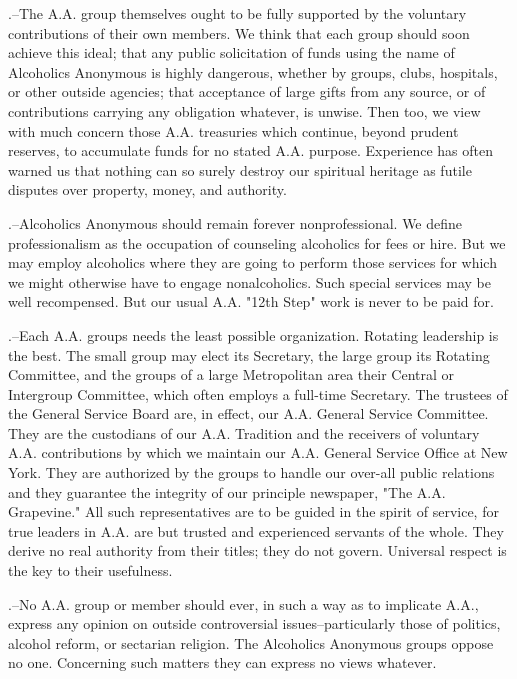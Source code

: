 \begin{biblechapter}
.--The A.A. group themselves ought to be fully supported 
    by the voluntary contributions of their own members.
    We think that each group should soon achieve this ideal; 
    that any public solicitation of funds 
    using the name of Alcoholics Anonymous is highly dangerous, 
    whether by groups, clubs, hospitals, or other outside agencies; 
    that acceptance of large gifts from any source, 
    or of contributions carrying any obligation whatever, is unwise.
    Then too, we view with much concern 
    those A.A. treasuries which continue, beyond prudent reserves, 
    to accumulate funds for no stated A.A. purpose.
    Experience has often warned us that nothing can so surely destroy our spiritual heritage as futile disputes over 
    property, money, and authority.

.--Alcoholics Anonymous should remain forever nonprofessional.
    We define professionalism as the occupation of 
    counseling alcoholics for fees or hire.
    But we may employ alcoholics 
    where they are going to perform those services for which 
    we might otherwise have to engage nonalcoholics.  
    Such special services may be well recompensed.
    But our usual A.A. "12th Step" work is never to be paid for.

.--Each A.A. groups needs the least possible organization.
    Rotating leadership is the best.
    The small group may elect its Secretary, 
    the large group its Rotating Committee, 
    and the groups of a large Metropolitan area their Central or Intergroup Committee, 
    which often employs a full-time Secretary.
    The trustees of the General Service Board are, in effect, 
    our A.A. General Service Committee.
    They are the custodians of our A.A. Tradition 
    and the receivers of voluntary A.A. contributions 
    by which we maintain our A.A. General Service Office at New York.
    They are authorized by the groups 
    to handle our over-all public relations 
    and they guarantee the integrity of our principle newspaper, 
    "The A.A. Grapevine."
    All such representatives are to be guided in the spirit of service, 
    for true leaders in A.A. are but 
    trusted and experienced servants of the whole.
    They derive no real authority from their titles; 
    they do not govern.
    Universal respect is the key to their usefulness.

.--No A.A. group or member should ever, 
    in such a way as to implicate A.A., 
    express any opinion on outside controversial issues--particularly 
    those of politics, alcohol reform, or sectarian religion.
    The Alcoholics Anonymous groups oppose no one.
    Concerning such matters they can express no views whatever.


\end{biblechapter}
